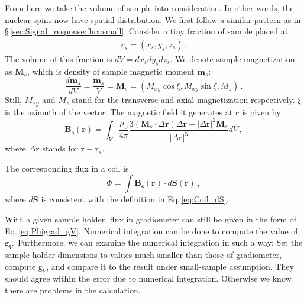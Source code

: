 From here we take the volume of sample into consideration. In other words, the nuclear spins now have spatial distribution. 
We first follow a similar pattern as in \S\,\ref{sec:Signal_response:flux:small}. Consider a tiny fraction of sample placed at 
\begin{align}
    \mathbf{r}_s =(x_s , y_s, z_s)\,.
\end{align}
The volume of this fraction is $dV = dx_s dy_s dz_s$. We denote sample magnetization as $\mathbf{M}_s$, which is density of sample magnetic moment $\mathbf{m}_s$: 
\begin{equation}\label{eq:largesample:m_s}
    \dfrac{d\mathbf{m}_s}{dV} = \dfrac{\mathbf{m}_s}{V} = \mathbf{M}_s = (M_{xy}\cos{\xi}, M_{xy}\sin{\xi}, M_{z}) \,.
\end{equation}
Still, $M_{xy}$ and $M_{z}$ stand for the transverse and axial magnetization respectively. $\xi$ is the azimuth of the vector. 
The magnetic field it generates at $\mathbf{r}$ is given by
\begin{equation}\label{eq:largesample:B_s}
    \mathbf{B_s}(\mathbf{r})=\int_{V} \frac{\mu_0}{4\pi} \frac{3(\mathbf{M}_s\cdot \Delta \mathbf{r})\Delta \mathbf{r} - |\Delta \mathbf{r}|^2 \mathbf{M}_s}{|\Delta \mathbf{r}|^5} dV\,,
\end{equation}
where $\Delta \mathbf{r}$ stands for $\mathbf{r} - \mathbf{r}_s$. 

The corresponding flux in a coil is
\begin{equation}
    \Phi = \int \mathbf{B_s}(\mathbf{r})\cdot d\mathbf{S}(\mathbf{r})\,, 
\end{equation}
where $d\mathbf{S} $ is consistent with the definition in Eq.\,\eqref{eq:Coil_dS}. 

With a given sample holder, flux in gradiometer can still be given in the form of Eq.\,\eqref{eq:Phigrad_gV}. Numerical integration can be done to compute the value of $\mathrm{g}_V$. 
Furthermore, we can examine the numerical integration in such a way: Set the sample holder dimensions to values much smaller than those of gradiometer, compute $\mathrm{g}_V$, and compare it to the result under small-sample assumption. They should agree within the error due to numerical integration. Otherwise we know there are problems in the calculation. 

